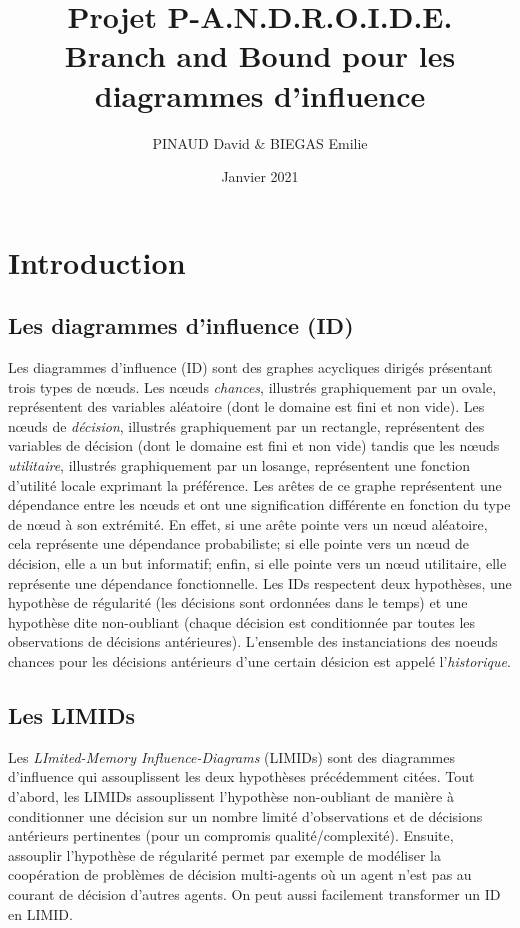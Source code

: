 \documentclass[12pt]{article}
\title{Projet P-A.N.D.R.O.I.D.E.\\
\bigbreak\textbf{Branch and Bound pour les diagrammes d'influence}}
\author{PINAUD David \& BIEGAS Emilie}
\date{Janvier 2021}
\affil{Université Sorbonne Sciences}
\begin{document}
\maketitle

\renewcommand{\contentsname}{Table des Matières}
\pagebreak
\tableofcontents
\pagebreak

\section{Introduction}

\subsection{Les diagrammes d'influence (ID)}
Les diagrammes d'influence (ID) sont des graphes acycliques dirigés présentant trois types de nœuds. 
Les nœuds \textit{chances}, illustrés graphiquement par un ovale, représentent des variables aléatoire (dont le domaine est fini et non vide). 
Les nœuds de \textit{décision}, illustrés graphiquement par un rectangle, représentent des variables de décision (dont le domaine est fini et non vide) tandis que les nœuds \textit{utilitaire}, illustrés graphiquement par un losange, représentent une fonction d'utilité locale exprimant la préférence.
Les arêtes de ce graphe représentent une dépendance entre les nœuds et ont une signification différente en fonction du type de nœud à son extrémité.
En effet, si une arête pointe vers un nœud aléatoire, cela représente une dépendance probabiliste; si elle pointe vers un nœud de décision, elle a un but informatif; enfin, si elle pointe vers un nœud utilitaire, elle représente une dépendance fonctionnelle.
\bigbreak
Les IDs respectent deux hypothèses, une hypothèse de régularité (les décisions sont ordonnées dans le temps) et une hypothèse dite non-oubliant (chaque décision est conditionnée par toutes les observations de décisions antérieures).
L'ensemble des instanciations des noeuds chances pour les décisions antérieurs d'une certain désicion est appelé l'\textit{historique}.


\subsection{Les LIMIDs}
 Les \textit{LImited-Memory Influence-Diagrams} (LIMIDs) sont des diagrammes d'influence qui assouplissent les deux hypothèses précédemment citées. Tout d'abord, les LIMIDs assouplissent l'hypothèse non-oubliant de manière à conditionner une décision sur un nombre limité d'observations et de décisions antérieurs pertinentes (pour un compromis qualité/complexité).
Ensuite, assouplir l'hypothèse de régularité permet par exemple de modéliser la coopération de problèmes de décision multi-agents où un agent n'est pas au courant de décision d'autres agents. On peut aussi facilement transformer un ID en LIMID.
\end{document}
